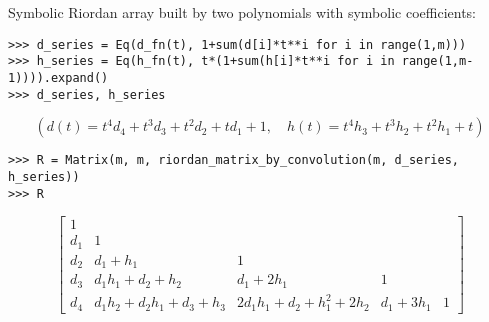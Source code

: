 \begin{example}
Symbolic Riordan array built by two polynomials with symbolic coefficients:
\begin{verbatim}
>>> d_series = Eq(d_fn(t), 1+sum(d[i]*t**i for i in range(1,m)))
>>> h_series = Eq(h_fn(t), t*(1+sum(h[i]*t**i for i in range(1,m-1)))).expand()
>>> d_series, h_series
\end{verbatim}
\begin{displaymath}
\left ( d{\left (t \right )} = t^{4} d_{4} + t^{3} d_{3} + t^{2} d_{2} + t d_{1} + 1, \quad h{\left (t \right )} = t^{4} h_{3} + t^{3} h_{2} + t^{2} h_{1} + t\right )
\end{displaymath}
\begin{verbatim}
>>> R = Matrix(m, m, riordan_matrix_by_convolution(m, d_series, h_series))
>>> R
\end{verbatim}
\begin{displaymath}
\left[\begin{matrix}1 &   &   &   &  \\d_{1} & 1 &   &   &  \\d_{2} & d_{1} + h_{1} & 1 &   &  \\d_{3} & d_{1} h_{1} + d_{2} + h_{2} & d_{1} + 2 h_{1} & 1 &  \\d_{4} & d_{1} h_{2} + d_{2} h_{1} + d_{3} + h_{3} & 2 d_{1} h_{1} + d_{2} + h_{1}^{2} + 2 h_{2} & d_{1} + 3 h_{1} & 1\end{matrix}\right]
\end{displaymath}
\end{example}

